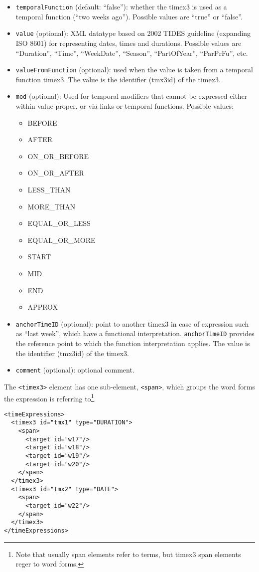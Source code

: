 \begin{itemize}
\begin{tabular}{|c|p{9cm}|}
  \end{tabular}

\item \texttt{temporalFunction} (default: ``false''): whether the timex3 is
  used as a temporal function (``two weeks ago''). Possible values are
  ``true'' or ``false''.

\item \texttt{value} (optional): XML datatype based on 2002 TIDES guideline
  (expanding ISO 8601) for representing dates, times and durations. Possible
  values are ``Duration'', ``Time'', ``WeekDate'', ``Season'',
  ``PartOfYear'', ``ParPrFu'', etc.

\item \texttt{valueFromFunction} (optional): used when the value is taken
  from a temporal function timex3. The value is the identifier (tmx3id) of
  the timex3.

\item \texttt{mod} (optional): Used for temporal modifiers that cannot be
  expressed either within value proper, or via links or temporal
  functions. Possible values:
  \begin{itemize}
  \item BEFORE
  \item AFTER
  \item ON\_OR\_BEFORE
  \item ON\_OR\_AFTER
  \item LESS\_THAN
  \item MORE\_THAN
  \item EQUAL\_OR\_LESS
  \item EQUAL\_OR\_MORE
  \item START
  \item MID
  \item END
  \item APPROX
  \end{itemize}

\item \texttt{anchorTimeID} (optional): point to another timex3 in case of
  expression such as ``last week'', which have a functional
  interpretation. \texttt{anchorTimeID} provides the reference point to
  which the function interpretation applies. The value is the identifier
  (tmx3id) of the timex3.
\item \texttt{comment} (optional): optional comment.
\end{itemize}

The \texttt{<timex3>} element has one sub-element, \texttt{<span>}, which
groups the word forms the expression is referring to\footnote{Note that
  usually span elements refer to terms, but timex3 span elements reger to
  word forms.}.

\begin{Verbatim}[fontsize=\small]
<timeExpressions>
  <timex3 id="tmx1" type="DURATION">
    <span>
      <target id="w17"/>
      <target id="w18"/>
      <target id="w19"/>
      <target id="w20"/>
    </span>
  </timex3>
  <timex3 id="tmx2" type="DATE">
    <span>
      <target id="w22"/>
    </span>
  </timex3>
</timeExpressions>
\end{Verbatim}

